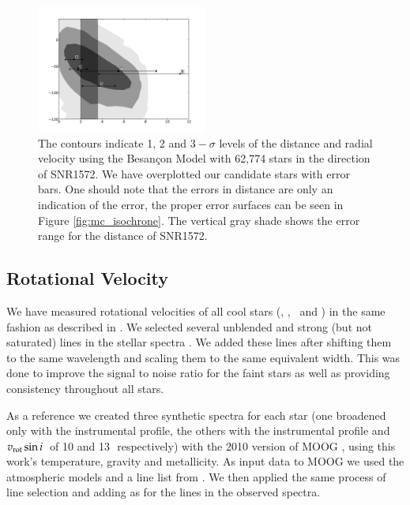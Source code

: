 
\begin{figure}[htbp] %
   \centering
   \includegraphics[width=0.5\textwidth]{chapter3/plots/dist_vr.pdf} 
   \caption{The contours indicate 1, 2 and $3-\sigma$ levels of the distance and radial velocity using the Besan\c{c}on Model \citep{2003A&A...409..523R} with 62,774 stars in the direction of SNR1572. We have overplotted our candidate stars with error bars. One should note that the errors in distance are only an indication of the error, the proper error surfaces can be seen in Figure \ref{fig:mc_isochrone}. The vertical gray shade shows the error range for the distance of SNR1572.}
   \label{fig:dist_vr}
\end{figure}



\subsection{Rotational Velocity}
\label{sec:rotation}
We have measured rotational velocities of all cool stars (\stara, \starc, \stare\ and \starg) in the same fashion as described in \wek. We selected several unblended and strong (but not saturated)  lines in the stellar spectra .  We added these lines after shifting them to the same wavelength and scaling them to the same equivalent width. This was done to improve the signal to noise ratio for the faint stars as well as providing consistency throughout all stars. 

 As a reference we created three synthetic spectra for each star (one broadened only with the instrumental profile, the others with the instrumental profile and $v_{\rm{rot}}\sin{i}$\ of 10 and 13\,\kms\ respectively) with the 2010 version of MOOG \citemoog, using this work's temperature, gravity and metallicity.  As input data to MOOG we used the \citet{2004astro.ph..5087C} atmospheric models and a line list from \citet{1995KurCD..23.....K}. We then applied the same process of line selection and adding as for the lines in the observed spectra. 
 
